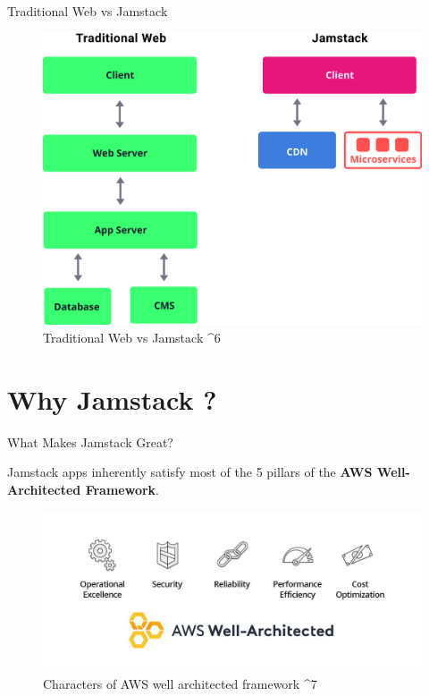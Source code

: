 \documentclass[aspectratio=169,9pt]{beamer}
\begin{document}
\begin{frame}{Traditional Web vs Jamstack}
\vspace{25pt}
\begin{figure}
    \begin{center}
        \includegraphics[scale=.68]{images/comparison.png}
        \caption{Traditional Web vs Jamstack ^6}
    \end{center}
\end{figure}
    
\end{frame}

\section{Why Jamstack ?}

\begin{frame}{What Makes Jamstack Great?}
    \vspace{2em}
    \begin{itemize}
        Jamstack apps inherently satisfy most of the 5 pillars of the \textbf{AWS Well-Architected Framework}.
    \end{itemize}
    \vfill
    \begin{figure}
        \includegraphics[scale=.25]{images/aws-well-architected-framework.jpg}
        \caption{Characters of AWS well architected framework ^7}
    \end{figure}
    
\end{frame}
\end{document}
